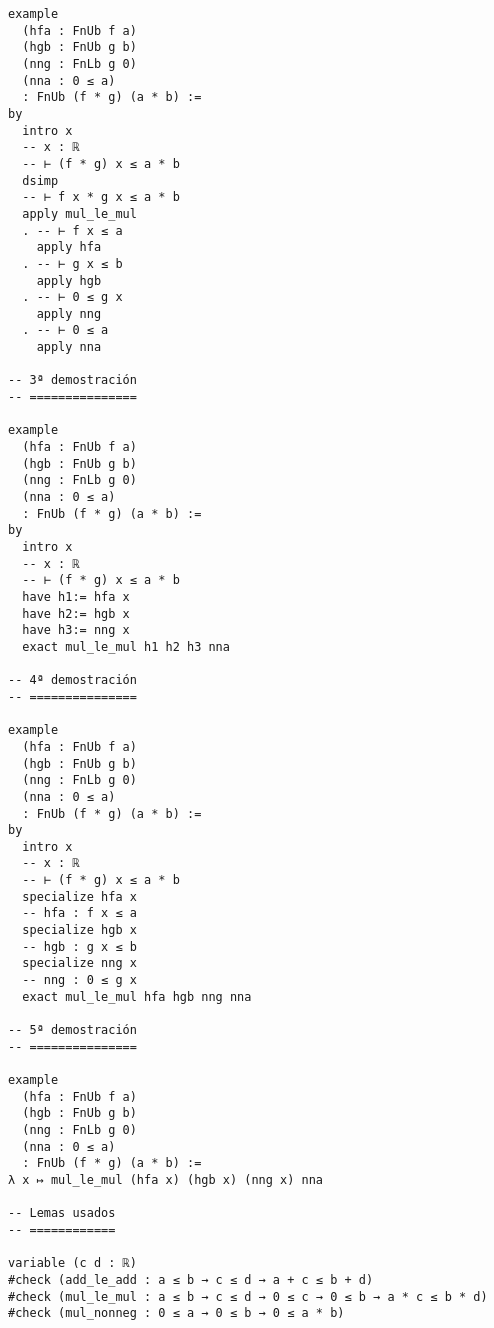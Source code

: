 \begin{verbatim}
example
  (hfa : FnUb f a)
  (hgb : FnUb g b)
  (nng : FnLb g 0)
  (nna : 0 ≤ a)
  : FnUb (f * g) (a * b) :=
by
  intro x
  -- x : ℝ
  -- ⊢ (f * g) x ≤ a * b
  dsimp
  -- ⊢ f x * g x ≤ a * b
  apply mul_le_mul
  . -- ⊢ f x ≤ a
    apply hfa
  . -- ⊢ g x ≤ b
    apply hgb
  . -- ⊢ 0 ≤ g x
    apply nng
  . -- ⊢ 0 ≤ a
    apply nna

-- 3ª demostración
-- ===============

example
  (hfa : FnUb f a)
  (hgb : FnUb g b)
  (nng : FnLb g 0)
  (nna : 0 ≤ a)
  : FnUb (f * g) (a * b) :=
by
  intro x
  -- x : ℝ
  -- ⊢ (f * g) x ≤ a * b
  have h1:= hfa x
  have h2:= hgb x
  have h3:= nng x
  exact mul_le_mul h1 h2 h3 nna

-- 4ª demostración
-- ===============

example
  (hfa : FnUb f a)
  (hgb : FnUb g b)
  (nng : FnLb g 0)
  (nna : 0 ≤ a)
  : FnUb (f * g) (a * b) :=
by
  intro x
  -- x : ℝ
  -- ⊢ (f * g) x ≤ a * b
  specialize hfa x
  -- hfa : f x ≤ a
  specialize hgb x
  -- hgb : g x ≤ b
  specialize nng x
  -- nng : 0 ≤ g x
  exact mul_le_mul hfa hgb nng nna

-- 5ª demostración
-- ===============

example
  (hfa : FnUb f a)
  (hgb : FnUb g b)
  (nng : FnLb g 0)
  (nna : 0 ≤ a)
  : FnUb (f * g) (a * b) :=
λ x ↦ mul_le_mul (hfa x) (hgb x) (nng x) nna

-- Lemas usados
-- ============

variable (c d : ℝ)
#check (add_le_add : a ≤ b → c ≤ d → a + c ≤ b + d)
#check (mul_le_mul : a ≤ b → c ≤ d → 0 ≤ c → 0 ≤ b → a * c ≤ b * d)
#check (mul_nonneg : 0 ≤ a → 0 ≤ b → 0 ≤ a * b)
\end{verbatim}

